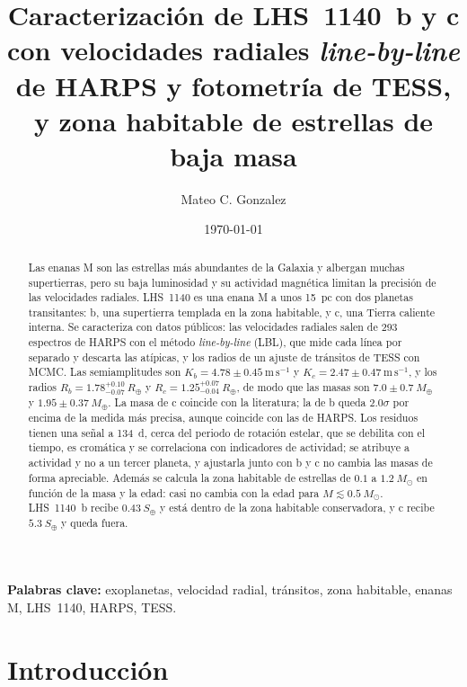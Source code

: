 \documentclass[twocolumn,aps,pra,11pt]{revtex4-2}
\newcommand{\Msun}{\ensuremath{M_\odot}}
\newcommand{\Mearth}{\ensuremath{M_\oplus}}
\newcommand{\Rearth}{\ensuremath{R_\oplus}}
\newcommand{\ms}{\ensuremath{\mathrm{m\,s^{-1}}}}
\begin{document}
\title{Caracterización de LHS~1140~b y c con velocidades radiales \emph{line-by-line} de HARPS y fotometría de TESS, y zona habitable de estrellas de baja masa}
\author{Mateo C. Gonzalez}
\date{\today}

\begin{abstract}
Las enanas M son las estrellas más abundantes de la Galaxia y albergan muchas supertierras, pero su baja luminosidad y su actividad magnética limitan la precisión de las velocidades radiales. LHS~1140 es una enana M a unos 15~pc con dos planetas transitantes: b, una supertierra templada en la zona habitable, y c, una Tierra caliente interna. Se caracteriza con datos públicos: las velocidades radiales salen de 293 espectros de HARPS con el método \emph{line-by-line} (LBL), que mide cada línea por separado y descarta las atípicas, y los radios de un ajuste de tránsitos de TESS con MCMC. Las semiamplitudes son $K_b = 4.78 \pm 0.45~\ms$ y $K_c = 2.47 \pm 0.47~\ms$, y los radios $R_b = 1.78^{+0.10}_{-0.07}~\Rearth$ y $R_c = 1.25^{+0.07}_{-0.04}~\Rearth$, de modo que las masas son $7.0 \pm 0.7~\Mearth$ y $1.95 \pm 0.37~\Mearth$. La masa de c coincide con la literatura; la de b queda $2.0\sigma$ por encima de la medida más precisa, aunque coincide con las de HARPS. Los residuos tienen una señal a 134~d, cerca del periodo de rotación estelar, que se debilita con el tiempo, es cromática y se correlaciona con indicadores de actividad; se atribuye a actividad y no a un tercer planeta, y ajustarla junto con b y c no cambia las masas de forma apreciable. Además se calcula la zona habitable de estrellas de $0.1$ a $1.2~\Msun$ en función de la masa y la edad: casi no cambia con la edad para $M \lesssim 0.5~\Msun$. LHS~1140~b recibe $0.43~S_\oplus$ y está dentro de la zona habitable conservadora, y c recibe $5.3~S_\oplus$ y queda fuera.
\end{abstract}
\maketitle
\noindent\textbf{Palabras clave:} exoplanetas, velocidad radial, tránsitos, zona habitable, enanas M, LHS~1140, HARPS, TESS.

\section{Introducción}
\end{document}
